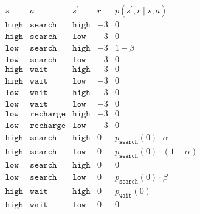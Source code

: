 \begin{solution}
\begin{align*}
    \begin{array}{l|l|l|r|l}
        s             & a                 & s^\prime      & r  & p(s^\prime, r \mid s, a)                \\ \hline
        \texttt{high} & \texttt{search}   & \texttt{high} & -3 & 0                                       \\
        \texttt{high} & \texttt{search}   & \texttt{low}  & -3 & 0                                       \\
        \texttt{low}  & \texttt{search}   & \texttt{high} & -3 & 1 - \beta                               \\
        \texttt{low}  & \texttt{search}   & \texttt{low}  & -3 & 0                                       \\
        \texttt{high} & \texttt{wait}     & \texttt{high} & -3 & 0                                       \\
        \texttt{high} & \texttt{wait}     & \texttt{low}  & -3 & 0                                       \\
        \texttt{low}  & \texttt{wait}     & \texttt{high} & -3 & 0                                       \\
        \texttt{low}  & \texttt{wait}     & \texttt{low}  & -3 & 0                                       \\
        \texttt{low}  & \texttt{recharge} & \texttt{high} & -3 & 0                                       \\
        \texttt{low}  & \texttt{recharge} & \texttt{low}  & -3 & 0                                       \\
        \texttt{high} & \texttt{search}   & \texttt{high} &  0 & p_\texttt{search}(0) \cdot \alpha       \\
        \texttt{high} & \texttt{search}   & \texttt{low}  &  0 & p_\texttt{search}(0) \cdot (1 - \alpha) \\
        \texttt{low}  & \texttt{search}   & \texttt{high} &  0 & 0                                       \\
        \texttt{low}  & \texttt{search}   & \texttt{low}  &  0 & p_\texttt{search}(0) \cdot \beta        \\
        \texttt{high} & \texttt{wait}     & \texttt{high} &  0 & p_\texttt{wait}(0)                      \\
        \texttt{high} & \texttt{wait}     & \texttt{low}  &  0 & 0                                       \\

\end{array}
\end{align*}
\end{solution}
